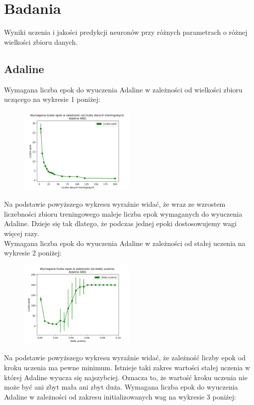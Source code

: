 \documentclass{article}
\begin{document}
	\section{Badania}
	Wyniki uczenia i jakości predykcji neuronów przy różnych parametrach o różnej wielkości zbioru danych.
	\subsection{Adaline}
	    Wymagana liczba epok do wyuczenia Adaline w zależności od wielkości zbioru uczącego na wykresie 1 poniżej:
	    
	\begin{figure}[h]

		\centering
		\caption{}
		\includegraphics[width=0.5\textwidth]{epoki_dane_adaline_and.png}
		
	\end{figure}	 
	Na podstawie powyższego wykresu wyraźnie widać, że wraz ze wzrostem liczebności zbioru treningowego maleje liczba epok wymaganych do wyuczenia Adaline. Dzieje się tak dlatego, że podczas jednej epoki dostosowujemy wagi więcej razy.\\[0.5cm] 
	
	Wymagana liczba epok do wyuczenia Adaline w zależności od stałej uczenia na wykresie 2 poniżej:
	
	\begin{figure}[h]

		\centering
		\caption{}
		\includegraphics[width=0.5\textwidth]{epoki_rate_adaline.png}
		
	\end{figure}   
	Na podstawie powyższego wykresu wyraźnie widać, że zależność liczby epok od kroku uczenia ma pewne minimum. Istnieje taki zakres wartości stałej uczenia w której Adaline wyucza się najszybciej. Oznacza to, że wartość kroku uczenia nie może być ani zbyt mała ani zbyt duża.
	\newpage
	Wymagana liczba epok do wyuczenia Adaline w zależności od zakresu initializowanych wag na wykresie 3 poniżej:
	
\end{document}
